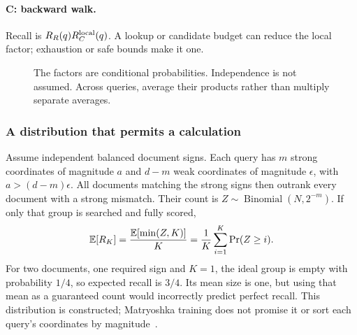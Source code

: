 \paragraph{C: backward walk.} Recall is $R_R(q)R_C^{\rm local}(q)$. A lookup or candidate
budget can reduce the local factor; exhaustion or safe bounds make it one.

\begin{figure}[H]\centering
{}
\caption{The factors are conditional probabilities. Independence is not assumed. Across
queries, average their products rather than multiply separate averages.}
\end{figure}

\subsubsection*{A distribution that permits a calculation}
Assume independent balanced document signs. Each query has $m$ strong coordinates of
magnitude $a$ and $d-m$ weak coordinates of magnitude $\epsilon$, with
$a>(d-m)\epsilon$. All documents matching the strong signs then outrank every document with
a strong mismatch. Their count is $Z\sim\operatorname{Binomial}(N,2^{-m})$. If only that
group is searched and fully scored,
\begin{equation}
 \mathbb E[R_K]=\frac{\mathbb E[\min(Z,K)]}{K}
         =\frac1K\sum_{i=1}^{K}\Pr(Z\ge i).
 \label{eq:ideal-recall}
\end{equation}
For two documents, one required sign and $K=1$, the ideal group is empty with probability
$1/4$, so expected recall is $3/4$. Its mean size is one, but using that mean as a guaranteed
count would incorrectly predict perfect recall. This distribution is constructed; Matryoshka
training does not promise it or sort each query's coordinates by magnitude~\cite{mrl}.


